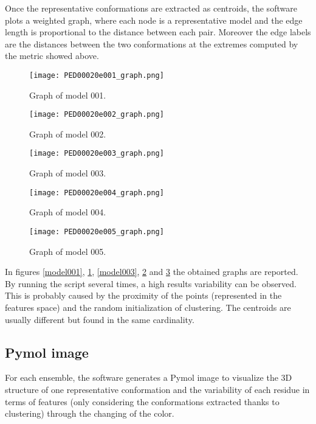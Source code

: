 Once the representative conformations are extracted as centroids, the software plots a weighted graph, where each node is a representative model and the edge length is proportional to the distance between each pair. Moreover the edge labels are the distances between the two conformations at the extremes computed by the metric showed above. 



\begin{figure}[H]
	\begin{minipage}[b]{0.47\textwidth}
		\centering
		\texttt{[image: PED00020e001\_graph.png]}
		\caption{Graph of model 001.}
		\label{model001}
	\end{minipage}
	\hfill
	\begin{minipage}[b]{0.47\textwidth}
		\centering
		\texttt{[image: PED00020e002\_graph.png]}
		\caption{Graph of model 002.}
		\label{model002}
	\end{minipage}
\end{figure}
\begin{figure}[H]
	\begin{minipage}[b]{0.47\textwidth}
		\centering
		\texttt{[image: PED00020e003\_graph.png]}
		\caption{Graph of model 003.}
		\label{model003}
	\end{minipage}
	\begin{minipage}[b]{0.47\textwidth}
		\centering
		\texttt{[image: PED00020e004\_graph.png]}
		\caption{Graph of model 004.}
		\label{model004}
	\end{minipage}
\end{figure}
\begin{figure}[H]
	\begin{minipage}[b]{0.47\textwidth}
		\centering
		\texttt{[image: PED00020e005\_graph.png]}
		\caption{Graph of model 005.}
		\label{model005}
	\end{minipage}
	\end{figure}

In figures \ref{model001}, \ref{model002}, \ref{model003}, \ref{model004} and \ref{model005} the obtained graphs are reported. By running the script several times, a high results variability can be observed.
This is probably caused by the proximity of the points (represented in the features space) and the random initialization of clustering. The centroids are usually different but found in the same cardinality.



\subsection{Pymol image}
For each ensemble, the software generates a Pymol image to visualize the 3D structure of one representative conformation and the variability of each residue in terms of features (only considering the conformations extracted thanks to clustering) through the changing of the color.

